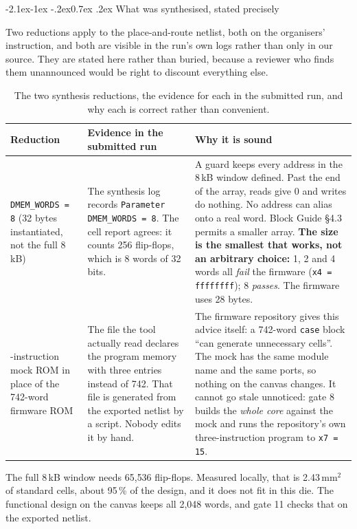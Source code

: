 \documentclass[11pt,a4paper]{article}
\makeatletter
\renewcommand\subsection{\@startsection{subsection}{2}{\z@}%
  {-2.1ex\@plus -1ex \@minus -.2ex}{0.7ex \@plus .2ex}%
  {\color{rvbldark}\normalfont\normalsize\bfseries}}
\newcommand{\ub}{\_\discretionary{}{}{}}     %
\newcommand{\hdr}[1]{\textbf{#1}}
\newcommand{\hrow}{\rowcolor{rvbltint}}
\makeatother
\begin{document}
\subsection{What was synthesised, stated precisely}

Two reductions apply to the place-and-route netlist, both on the organisers' instruction,
and both are visible in the run's own logs rather than only in our source. They are stated
here rather than buried, because a reviewer who finds them unannounced would be right to
discount everything else.

\begin{table}[htbp]
\centering\small
\caption{The two synthesis reductions, the evidence for each in the submitted run, and why
each is correct rather than convenient.}
\label{tab:reductions}
\begin{tabularx}{\linewidth}{>{\raggedright\arraybackslash}p{3.3cm}>{\raggedright\arraybackslash}p{5.4cm}X}
\toprule
\hrow \hdr{Reduction} & \hdr{Evidence in the submitted run} & \hdr{Why it is sound} \\
\midrule
\texttt{DMEM\_WORDS = 8} (32 bytes instantiated, not the full 8\,kB) &
The synthesis log records \texttt{Parameter DMEM\ub WORDS = 8}. The cell report agrees:
it counts 256 flip-flops, which is 8 words of 32 bits. &
A guard keeps every address in the 8\,kB window defined. Past the end of the array, reads
give 0 and writes do nothing. No address can alias onto a real word. Block Guide \S4.3
permits a smaller array. \textbf{The size is the smallest that works, not an arbitrary
choice:} 1, 2 and 4 words all \emph{fail} the firmware (\texttt{x4 = ffffffff}); 8
\emph{passes}. The firmware uses 28 bytes. \\
\addlinespace
3-instruction mock ROM in place of the 742-word firmware ROM &
The file the tool actually read declares the program memory with three entries instead
of 742. That file is generated from the exported netlist by a script. Nobody edits it by
hand. &
The firmware repository gives this advice itself: a 742-word \texttt{case} block ``can
generate unnecessary cells''. The mock has the same module name and the same ports, so
nothing on the canvas changes. It cannot go stale unnoticed: gate 8 builds the
\emph{whole core} against the mock and runs the repository's own three-instruction
program to \texttt{x7 = 15}. \\
\bottomrule
\end{tabularx}
\end{table}

The full 8\,kB window needs 65{,}536 flip-flops. Measured locally, that is 2.43\,mm$^2$ of
standard cells, about 95\,\% of the design, and it does not fit in this die. The functional
design on the canvas keeps all 2{,}048 words, and gate 11 checks that on the exported
netlist.
\end{document}
